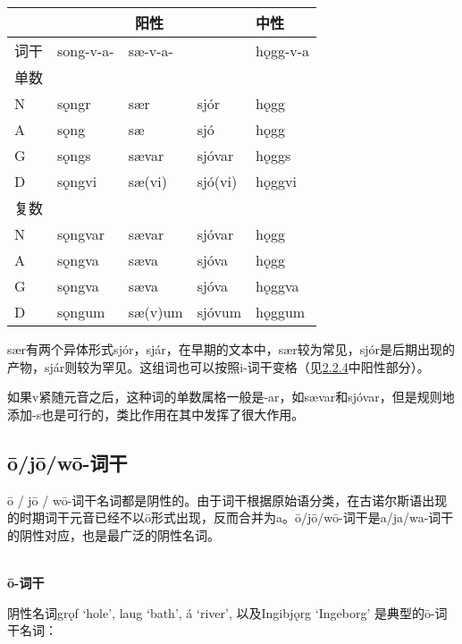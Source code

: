\begin{longtable}{lllll}
    \toprule
         & \multicolumn{3}{c}{\textbf{阳性}} & \textbf{中性}                         \\
    \midrule
    \endhead
    \bottomrule
    \endfoot
    词干 & song-v-a-                & sæ-v-a- &         & hǫgg-v-a \\
    单数 &                          &         &         &          \\
    N    & sǫngr                    & sær     & sjór    & hǫgg     \\
    A    & sǫng                     & sæ      & sjó     & hǫgg     \\
    G    & sǫngs                    & sævar   & sjóvar  & hǫggs    \\
    D    & sǫngvi                   & sæ(vi)  & sjó(vi) & hǫggvi   \\
    复数 &                          &         &         &          \\
    N    & sǫngvar                  & sævar   & sjóvar  & hǫgg     \\
    A    & sǫngva                   & sæva    & sjóva   & hǫgg     \\
    G    & sǫngva                   & sæva    & sjóva   & hǫggva   \\
    D    & sǫngum                   & sæ(v)um & sjóvum  & hǫggum   \\
  \end{longtable}
  
sær有两个异体形式sjór，sjár，在早期的文本中，sær较为常见，sjór是后期出现的产物，sjár则较为罕见。这组词也可以按照i-词干变格（见\hyperref[_Ref115770706]{2.2.4}中阳性部分）。

如果v紧随元音之后，这种词的单数属格一般是-ar，如sævar和sjóvar，但是规则地添加-s也是可行的，类比作用在其中发挥了很大作用。

\subsection{ō/jō/wō-词干}
\label{ō/jō/wō-词干}

ō / jō /
wō-词干名词都是阴性的。由于词干根据原始语分类，在古诺尔斯语出现的时期词干元音已经不以ō形式出现，反而合并为a。ō/jō/wō-词干是a/ja/wa-词干的阴性对应，也是最广泛的阴性名词。

~\\
\textbf{ō-词干}

阴性名词grǫf `hole', laug `bath', á `river‌', 以及Ingibjǫrg `Ingeborg‌'
是典型的ō-词干名词：

